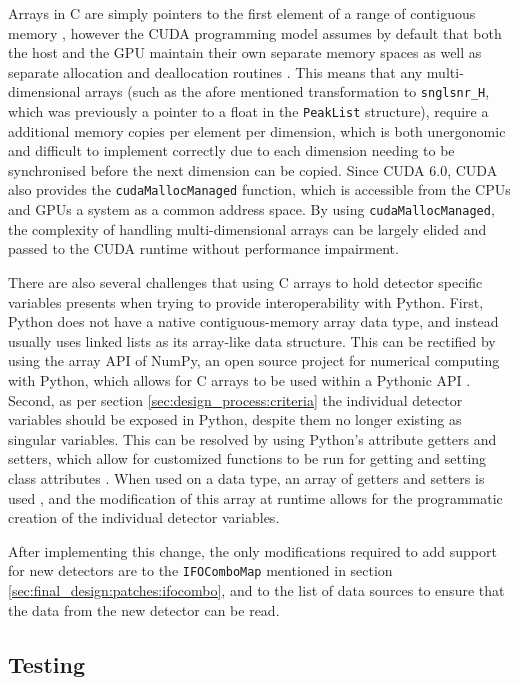 \documentclass{article}
\begin{document}
Arrays in C are simply pointers to the first element of a range of contiguous memory \cite{cpplang}, however the CUDA programming model assumes by default that both the host and the GPU maintain their own separate memory spaces as well as separate allocation and deallocation routines \cite{CUDA_Guide}.
This means that any multi-dimensional arrays (such as the afore mentioned transformation to \texttt{snglsnr\_H}, which was previously a pointer to a float in the \texttt{PeakList} structure), require a additional memory copies per element per dimension, which is both unergonomic and difficult to implement correctly due to each dimension needing to be synchronised before the next dimension can be copied.
Since CUDA 6.0, CUDA also provides the \texttt{cudaMallocManaged} function, which is accessible from the CPUs and GPUs a system as a common address space.
By using \texttt{cudaMallocManaged}, the complexity of handling multi-dimensional arrays can be largely elided and passed to the CUDA runtime without performance impairment.

There are also several challenges that using C arrays to hold detector specific variables presents when trying to provide interoperability with Python.
First, Python does not have a native contiguous-memory array data type, and instead usually uses linked lists as its array-like data structure.
This can be rectified by using the array API of NumPy, an open source project for numerical computing with Python, which allows for C arrays to be used within a Pythonic API \cite{nparray}.
Second, as per section \ref{sec:design_process:criteria} the individual detector variables should be exposed in Python, despite them no longer existing as singular variables.
This can be resolved by using Python's attribute getters and setters, which allow for customized functions to be run for getting and setting class attributes \cite{pygetset}.
When used on a data type, an array of getters and setters is used \cite{pytype_getset}, and the modification of this array at runtime allows for the programmatic creation of the individual detector variables.

After implementing this change, the only modifications required to add support for new detectors are to the \texttt{IFOComboMap} mentioned in section \ref{sec:final_design:patches:ifocombo}, and to the list of data sources to ensure that the data from the new detector can be read.

\subsection{Testing} \label{sec:final_design:testing}
\end{document}
